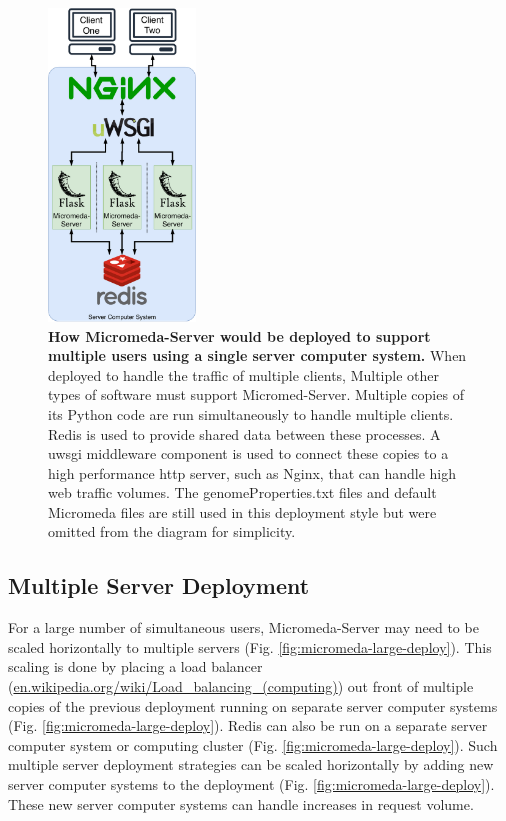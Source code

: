 \begin{figure}[!ht]
  \centering
	\includegraphics[width=0.35\textwidth]{media/micromeda-medium-deployment.pdf}
	 \caption[How Micromeda-Server would be deployed to support multiple users using 
a single server computer system.]{\textbf{How Micromeda-Server would be deployed 
to support multiple users using a single server computer system.} When deployed 
to handle the traffic of multiple clients, Multiple other types of software must 
support Micromed-Server. Multiple copies of its Python code are run 
simultaneously to handle multiple clients. Redis is used to provide shared data 
between these processes. A \gls{uwsgi} middleware component is used to connect 
these copies to a high performance \gls{http} server, such as Nginx, that can 
handle high web traffic volumes. The genomeProperties.txt files and default 
Micromeda files are still used in this deployment style but were omitted from 
the diagram for simplicity.}
	 \label{fig:micromeda-medium-deploy}
\end{figure}

\subsection{Multiple Server Deployment} 
\label{multi-server-micromeda-deployment}

For a large number of simultaneous users, Micromeda-Server may need to be scaled 
horizontally to multiple servers (Fig. \ref{fig:micromeda-large-deploy}). This 
scaling is done by placing a load balancer 
(\href{http://en.wikipedia.org/wiki/Load_balancing_(computing)}{en.wikipedia.org/wiki/Load\_balancing\_(computing)}) 
out front of multiple copies of the previous deployment running on separate 
server computer systems (Fig. \ref{fig:micromeda-large-deploy}). Redis can also 
be run on a separate server computer system or computing cluster (Fig. 
\ref{fig:micromeda-large-deploy}). Such multiple server deployment strategies 
can be scaled horizontally by adding new server computer systems to the 
deployment (Fig. \ref{fig:micromeda-large-deploy}). These new server computer 
systems can handle increases in request volume.

